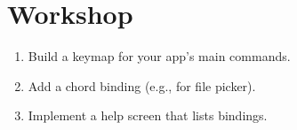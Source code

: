\section*{Workshop}

\begin{enumerate}[leftmargin=*]
  \item Build a keymap for your app's main commands.
  \item Add a chord binding (e.g.,  for
    file picker).
  \item Implement a help screen that lists bindings.
\end{enumerate}
